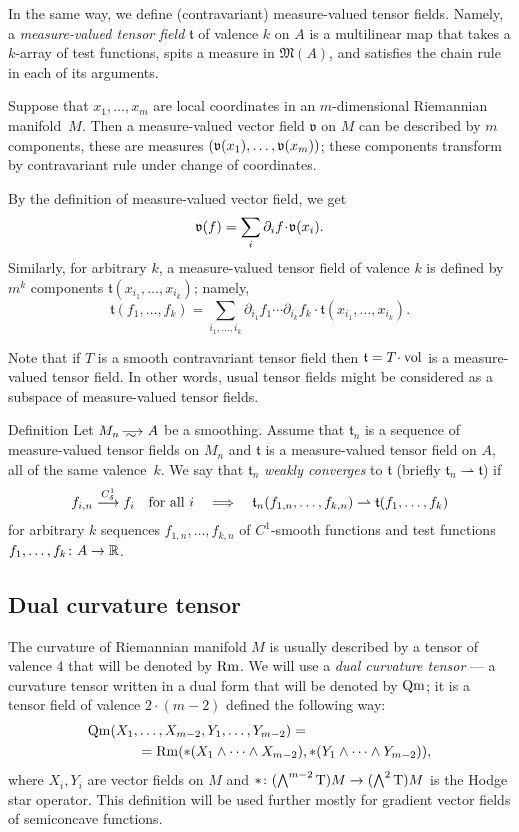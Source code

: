 In the same way, we define (contravariant) measure-valued tensor fields.
Namely, a \emph{measure-valued tensor field} $\mathfrak{t}$ of valence $k$ on $A$ is a multilinear map that takes a $k$-array of test  functions, spits a measure in $\mathfrak M(A)$, and satisfies the chain rule in each of its arguments.

Suppose that $x_1,\dots,x_m$ are local coordinates in an $m$-dimensional Riemannian manifold~$M$.
Then a measure-valued vector field $\mathfrak{v}$ on $M$ can be described by $m$ components, these are measures $(\vv(x_1),\zz\dots,\vv(x_m))$;
these components transform by contravariant rule under change of coordinates.

By the definition of measure-valued vector field, we get
\[\mathfrak{v}(f)=\sum_{i}\partial_i f\cdot \vv(x_i).\]
Similarly, for arbitrary $k$, a measure-valued tensor field of valence $k$ is defined by $m^k$ components 
$\mathfrak{t}(x_{i_1},\dots,x_{i_k})$; namely,
\[\mathfrak{t}(f_1,\dots,f_k)
=
\sum_{i_1,\dots,i_k}
\partial_{i_1} f_1 
\cdots 
\partial_{i_k} f_k
\cdot \mathfrak{t}(x_{i_1},\dots,x_{i_k}).\]

Note that if $T$ is a smooth contravariant tensor field then $\mathfrak{t}=T\cdot \vol$ is a measure-valued tensor field.
In other words, usual tensor fields might be considered as a subspace of measure-valued tensor fields.

\begin{rdef}{Definition}
Let $M_n\smooths{} A$ be a smoothing.
Assume that $\mathfrak{t}_n$ is a sequence of %
 measure-valued tensor fields on $M_n$  and $\mathfrak{t}$ is a measure-valued tensor field on $A$,
all of the same valence~$k$.
We say that $\mathfrak{t}_n$ \emph{weakly converges} to  $\mathfrak{t}$
(briefly $\mathfrak{t}_n\rightharpoonup\mathfrak{t}$) if
\[f_{i,n}\smoothto f_i\quad\text{for all\ } i
\quad\Longrightarrow\quad
\mathfrak{t}_n(f_{1,n},\dots,f_{k,n})\zz\rightharpoonup\mathfrak{t}(f_{1},\dots,f_{k})\]
for arbitrary $k$ sequences $f_{1,n},\dots,f_{k,n}$ of $C^1$-smooth functions and test functions $f_1,\dots,f_k\:A\zz\to\RR$.
\end{rdef}

\subsection{Dual curvature tensor}

The curvature of Riemannian manifold $M$ is usually described by a tensor of valence 4 that will be denoted by $\operatorname{\rm Rm}$.
We will use a \emph{dual curvature tensor} --- 
a curvature tensor written in a dual form that will be denoted by $\operatorname{\rm Qm}$;
it is a tensor field of valence $2\cdot(m-2)$ defined the following way:
\begin{align*}
\operatorname{\rm Qm}(X_1,&\dots,X_{m-2},Y_1,\dots,Y_{m-2})
= 
\\
&=
\operatorname{\rm Rm}(*(X_1\wedge\dots\wedge X_{m-2}),*(Y_1\wedge\dots\wedge Y_{m-2})),
\end{align*}
where $X_i,Y_i$ are vector fields on $M$ and  ${*}\:(\bigwedge^{m-2}\T)M\zz\to(\bigwedge^2\T)M$ is the  Hodge star operator.
This definition will be used further mostly for gradient vector fields of semiconcave functions.

